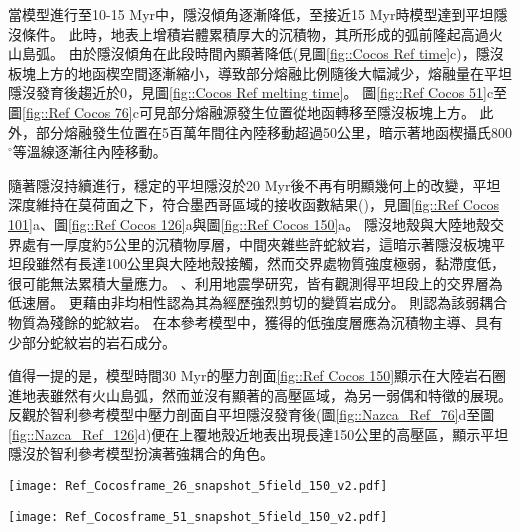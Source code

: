 當模型進行至10-15 Myr中，隱沒傾角逐漸降低，至接近15 Myr時模型達到平坦隱沒條件。
此時，地表上增積岩體累積厚大的沉積物，其所形成的弧前隆起高過火山島弧。
由於隱沒傾角在此段時間內顯著降低(見圖\ref{fig::Cocos Ref time}c)，隱沒板塊上方的地函楔空間逐漸縮小，導致部分熔融比例隨後大幅減少，熔融量在平坦隱沒發育後趨近於0，見圖\ref{fig::Cocos Ref melting time}。
圖\ref{fig::Ref Cocos 51}c至圖\ref{fig::Ref Cocos 76}c可見部分熔融源發生位置從地函轉移至隱沒板塊上方。
此外，部分熔融發生位置在5百萬年間往內陸移動超過50公里，暗示著地函楔攝氏800$^{\circ}$等溫線逐漸往內陸移動。

隨著隱沒持續進行，穩定的平坦隱沒於20 Myr後不再有明顯幾何上的改變，平坦深度維持在莫荷面之下，符合墨西哥區域的接收函數結果(\citealp{PerezCampos2008})，見圖\ref{fig::Ref Cocos 101}a、圖\ref{fig::Ref Cocos 126}a與圖\ref{fig::Ref Cocos 150}a。
隱沒地殼與大陸地殼交界處有一厚度約5公里的沉積物厚層，中間夾雜些許蛇紋岩，這暗示著隱沒板塊平坦段雖然有長達100公里與大陸地殼接觸，然而交界處物質強度極弱，黏滯度低，很可能無法累積大量應力。
\citet{Song2009}、\citet{Song2012SC}利用地震學研究，皆有觀測得平坦段上的交界層為低速層。
\citet{Song2012SC}更藉由非均相性認為其為經歷強烈剪切的變質岩成分。
\citet{Manea2017}則認為該弱耦合物質為殘餘的蛇紋岩。
在本參考模型中，獲得的低強度層應為沉積物主導、具有少部分蛇紋岩的岩石成分。

值得一提的是，模型時間30 Myr的壓力剖面\ref{fig::Ref Cocos 150}顯示在大陸岩石圈進地表雖然有火山島弧，然而並沒有顯著的高壓區域，為另一弱偶和特徵的展現。
反觀於智利參考模型中壓力剖面自平坦隱沒發育後(圖\ref{fig::Nazca_Ref_76}d至圖\ref{fig::Nazca_Ref_126}d)便在上覆地殼近地表出現長達150公里的高壓區，顯示平坦隱沒於智利參考模型扮演著強耦合的角色。

\begin{figure*}[htp]
    \centering
    \texttt{[image: Ref\_Cocosframe\_26\_snapshot\_5field\_150\_v2.pdf]}
    \caption[墨西哥參考模型於5 Myr時之結果]{墨西哥參考模型於5 Myr時之結果。(a)為岩相剖面，圖中實線為攝氏200-1200度等溫線，粉紅虛線為攝氏1330度等溫線。(b)為黏滯度剖面，(c)為密度剖面，黃點標示部分熔融位置，(d)為動水壓力剖面，(e)為應變率第二不變量。圖(b)-(e)中的灰色實線描繪攝氏400$^{\circ}$、600$^{\circ}$與800$^{\circ}$等溫線。}
    \label{fig::Ref Cocos 26}
\end{figure*}

\begin{figure*}[htp]
    \centering
    \texttt{[image: Ref\_Cocosframe\_51\_snapshot\_5field\_150\_v2.pdf]}
    \caption[墨西哥參考模型於10 Myr時之結果]{墨西哥參考模型於10 Myr時之結果。(a)為岩相剖面，圖中實線為攝氏200-1200度等溫線，粉紅虛線為攝氏1330度等溫線。(b)為黏滯度剖面，(c)為密度剖面，黃點標示部分熔融位置，(d)為動水壓力剖面，(e)為應變率第二不變量。圖(b)-(e)中的灰色實線描繪攝氏400$^{\circ}$、600$^{\circ}$與800$^{\circ}$等溫線。}
    \label{fig::Ref Cocos 51}
\end{figure*}

